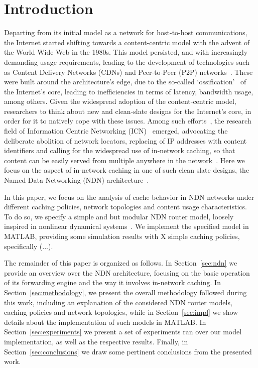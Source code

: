 \section{Introduction}
\label{sec:intro}

Departing from its initial model as a network for host-to-host communications, 
the Internet started shifting towards a content-centric model with the advent of 
the World Wide Web in the 1980s. This model persisted, 
and with increasingly demanding usage requirements, leading to the 
development of technologies such as 
Content Delivery Networks (CDNs) and Peer-to-Peer (P2P) 
networks~\cite{Passarella20121}. These were built around the architecture's 
edge, due to the so-called 
`ossification'~\cite{Handley:2006:WIO:1188052.1188101} of the Internet's core, 
leading to inefficiencies in terms of latency, bandwidth usage, among others. 
Given the widespread adoption of the content-centric model, 
researchers to think about new and clean-slate designs 
for the Internet's core, in order for it to natively cope with these issues. Among 
such efforts~\cite{5936152}, the research field of Information Centric Networking 
(ICN)~\cite{Xylomenos2013} emerged, 
advocating the deliberate abolition of network locators, replacing of IP 
addresses with content identifiers and calling for the widespread use of 
in-network caching, so that content can be easily served from multiple 
anywhere in the network~\cite{Koponen2007,Jacobson2009,Trossen2012,
Raychaudhuri2012,Han2012,Dannewitz:2013:NII:2459510.2459643}. Here we focus on the aspect of 
in-network caching in one of such clean slate designs, 
the Named Data Networking (NDN) architecture~\cite{Jacobson2009}.\shortvertbreak

In this paper, we focus on the analysis of cache behavior in NDN 
networks under different caching policies, network topologies and content 
usage characteristics. To do so, we specify a simple and but modular NDN router 
model, loosely inspired in nonlinear dynamical 
systems~\cite{Hedrick2010}. We implement the specified model in MATLAB, providing 
some simulation results with X simple caching policies, specifically (...).\shortvertbreak

The remainder of this paper is organized as follows. In Section~\ref{sec:ndn} we provide an 
overview over the NDN architecture, focusing on the basic operation of its 
forwarding engine and the way it involves in-network caching. In 
Section~\ref{sec:methodology}, we present the overall methodology followed 
during this work, including an explanation of the considered NDN router models, 
caching policies and network topologies, while in 
Section~\ref{sec:impl} we show details about the implementation of 
such models in MATLAB. In Section~\ref{sec:experiments} we present a set of 
experiments ran over our model implementation, as well as the respective 
results. Finally, in Section~\ref{sec:conclusions} we draw some pertinent 
conclusions from the presented work.
